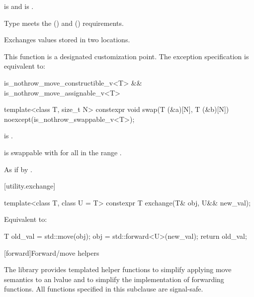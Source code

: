 \begin{itemdescr}
\pnum
\constraints
{} is  and
 is .

\pnum
\expects
Type
meets the
 ()
and
 ()
requirements.

\pnum
\effects
Exchanges values stored in two locations.

\pnum
\remarks
This function
is a designated customization point.
The exception specification is equivalent to:

\begin{codeblock}
is_nothrow_move_constructible_v<T> && is_nothrow_move_assignable_v<T>
\end{codeblock}
\end{itemdescr}

%
\begin{itemdecl}
template<class T, size_t N>
  constexpr void swap(T (&a)[N], T (&b)[N]) noexcept(is_nothrow_swappable_v<T>);
\end{itemdecl}

\begin{itemdescr}
\pnum
\constraints
{} is .

\pnum
\expects
{} is swappable with 
for all  in the range .

\pnum
\effects
As if by .
\end{itemdescr}

[utility.exchange]{}

%
\begin{itemdecl}
template<class T, class U = T>
  constexpr T exchange(T& obj, U&& new_val);
\end{itemdecl}

\begin{itemdescr}
\pnum
\effects
Equivalent to:
\begin{codeblock}
T old_val = std::move(obj);
obj = std::forward<U>(new_val);
return old_val;
\end{codeblock}
\end{itemdescr}


[forward]{Forward/move helpers}

\pnum
The library provides templated helper functions to simplify
applying move semantics to an lvalue and to simplify the implementation
of forwarding functions.
%
%
%
All functions specified in this subclause are signal-safe.

